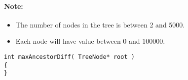 \paragraph{Note:}

\begin{itemize}
\item The number of nodes in the tree is between 2 and 5000.
\item Each node will have value between 0 and 100000.
\end{itemize}

\setcounter{lstlisting}{0}
\begin{lstlisting}[style=customc, caption={TODO}]
int maxAncestorDiff( TreeNode* root )
{
}
\end{lstlisting}